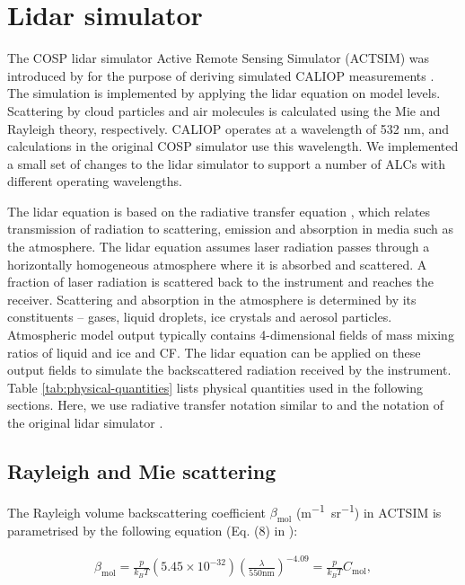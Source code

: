 \section{Lidar simulator}
\label{sec:lidar-simulator}

The COSP lidar simulator Active Remote Sensing Simulator (ACTSIM) was
introduced by \cite{chiriaco2006} for the purpose
of deriving simulated CALIOP measurements \citep{chepfer2007,chepfer2008}.
The simulation is implemented by applying the lidar equation on model levels.
Scattering by cloud particles
and air molecules is calculated using the Mie and Rayleigh theory,
respectively. CALIOP operates at a wavelength of 532 nm, and
calculations in the original COSP simulator use this wavelength.
We implemented a small set of changes to the lidar simulator to support a
number of ALCs with different operating wavelengths.

The lidar equation \citep{emeis2010} is based on the radiative transfer equation \citep{goody1995,liou2002,petty2006,zdunkowski2007},
which relates transmission of radiation to scattering, emission and absorption
in media such as the atmosphere. The lidar equation assumes laser radiation
passes through a
horizontally homogeneous atmosphere where it is absorbed and scattered. A fraction
of laser radiation is scattered back to the instrument and reaches the receiver.
Scattering and absorption in the
atmosphere is determined by its constituents -- gases, liquid droplets,
ice crystals and aerosol particles.
Atmospheric model output typically contains 4-dimensional fields of mass mixing ratios
of liquid and ice and CF. The lidar equation can be applied on these
output fields to simulate the backscattered radiation received by the instrument.
Table \ref{tab:physical-quantities} lists physical quantities used in the
following sections. Here, we use radiative transfer notation similar to
\cite{petty2006} and the notation of the original lidar simulator
\citep{chiriaco2006}.

\subsection{Rayleigh and Mie scattering}
\label{sec:rayleigh-and-mie-scattering}

The Rayleigh volume backscattering coefficient $\beta_\text{mol}$ (\unit{m^{-1}sr^{-1}}) in ACTSIM is parametrised by the following equation
(Eq. (8) in \cite{chiriaco2006}):

\begin{align}
\beta_\text{mol} = \frac{p}{k_BT}(5.45\times 10^{-32})\left(\frac{\lambda}{550 \mathrm{nm}}\right)^{-4.09}
= \frac{p}{k_BT}C_\text{mol} ,
\end{align}

